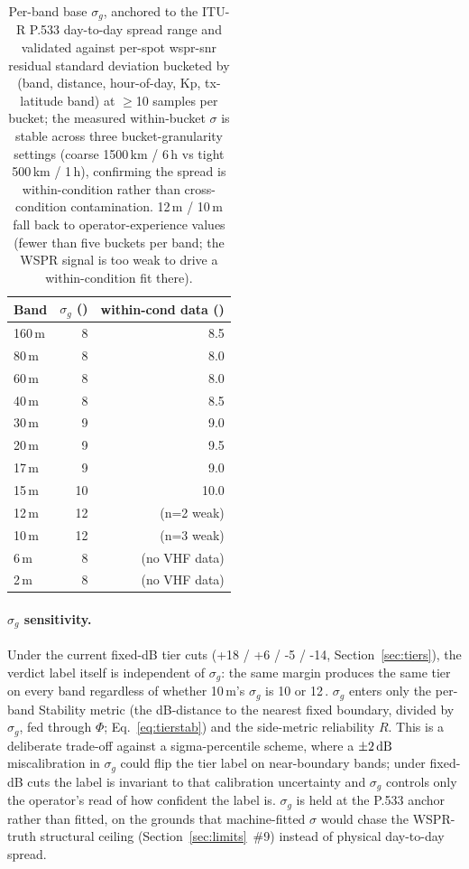 \documentclass[11pt,a4paper]{article}
\newcommand{\SI}[2]{#1\,\text{#2}}
\newcommand{\si}[1]{\text{#1}}
\newcommand{\dB}{\text{dB}}
\begin{document}
\begin{table}[H]
\centering
\caption{Per-band base $\sigma_g$, anchored to the ITU-R P.533
day-to-day spread range and validated against per-spot wspr-snr
residual standard deviation bucketed by (band, distance,
hour-of-day, Kp, tx-latitude band) at $\geq$10 samples per
bucket; the measured within-bucket $\sigma$ is stable across
three bucket-granularity settings (coarse 1500\,km / 6\,h vs
tight 500\,km / 1\,h), confirming the spread is within-condition
rather than cross-condition contamination.  12\,m / 10\,m fall
back to operator-experience values (fewer than five buckets per
band; the WSPR signal is too weak to drive a within-condition
fit there).}
\label{tab:bandsigma}
\begin{tabular}{@{}lrr@{}}
\toprule
\textbf{Band} & {$\sigma_g$ (\si{\dB})} & {within-cond data (\si{\dB})} \\
\midrule
160\,m &  8 &  8.5 \\
80\,m  &  8 &  8.0 \\
60\,m  &  8 &  8.0 \\
40\,m  &  8 &  8.5 \\
30\,m  &  9 &  9.0 \\
20\,m  &  9 &  9.5 \\
17\,m  &  9 &  9.0 \\
15\,m  & 10 & 10.0 \\
12\,m  & 12 & (n=2 weak) \\
10\,m  & 12 & (n=3 weak) \\
6\,m   &  8 & (no VHF data) \\
2\,m   &  8 & (no VHF data) \\
\bottomrule
\end{tabular}
\end{table}

\paragraph{$\sigma_g$ sensitivity.}  Under the current fixed-dB
tier cuts (+18 / +6 / -5 / -14, Section~\ref{sec:tiers}), the
verdict label itself is independent of $\sigma_g$: the same
margin produces the same tier on every band regardless of
whether 10\,m's $\sigma_g$ is 10 or 12\,\si{\dB}.  $\sigma_g$
enters only the per-band Stability metric (the dB-distance to the
nearest fixed boundary, divided by $\sigma_g$, fed through $\Phi$;
Eq.~\ref{eq:tierstab}) and the side-metric reliability $R$.  This
is a deliberate trade-off against a sigma-percentile
scheme, where a $\pm \SI{2}{\dB}$ miscalibration in $\sigma_g$
could flip the tier label on near-boundary bands; under fixed-dB
cuts the label is invariant to that calibration uncertainty and
$\sigma_g$ controls only the operator's read of how confident
the label is.  $\sigma_g$ is held at the P.533 anchor rather
than fitted, on the grounds that machine-fitted $\sigma$ would
chase the WSPR-truth structural ceiling
(Section~\ref{sec:limits}~\#9) instead of physical day-to-day
spread.
\end{document}
